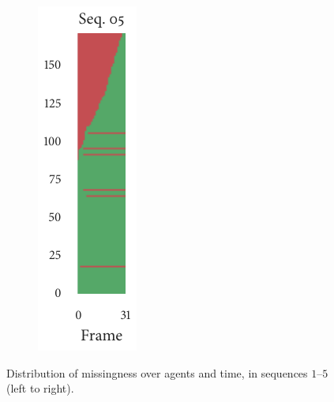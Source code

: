 \begin{figure}[h]
\begin{subfigure}[b]{0.2\textwidth}
		\includegraphics{missingness_sequence05.pdf}
	\end{subfigure}%
	\caption{Distribution of missingness over agents and time, in sequences $1$--$5$ (left to right).}
\end{figure}

